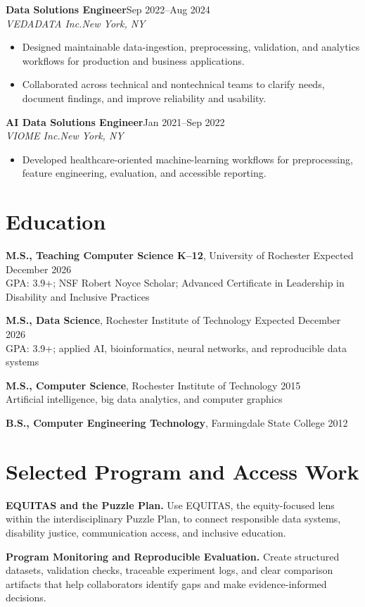 \documentclass[10pt,letterpaper]{article}
\newcommand{\role}[4]{%
  \textbf{#1}\hfill #2\\
  \textit{#3}\hfill \textit{#4}\vspace{-3pt}
}
\begin{document}
\role{Data Solutions Engineer}{Sep 2022--Aug 2024}
{VEDADATA Inc.}{New York, NY}
\begin{itemize}
  \item Designed maintainable data-ingestion, preprocessing, validation, and
    analytics workflows for production and business applications.
  \item Collaborated across technical and nontechnical teams to clarify needs,
    document findings, and improve reliability and usability.
\end{itemize}

\role{AI Data Solutions Engineer}{Jan 2021--Sep 2022}
{VIOME Inc.}{New York, NY}
\begin{itemize}
  \item Developed healthcare-oriented machine-learning workflows for
    preprocessing, feature engineering, evaluation, and accessible reporting.
\end{itemize}

\section*{Education}
\textbf{M.S., Teaching Computer Science K--12}, University of Rochester
\hfill Expected December 2026\\
GPA: 3.9+; NSF Robert Noyce Scholar; Advanced Certificate in Leadership in
Disability and Inclusive Practices

\textbf{M.S., Data Science}, Rochester Institute of Technology
\hfill Expected December 2026\\
GPA: 3.9+; applied AI, bioinformatics, neural networks, and reproducible data systems

\textbf{M.S., Computer Science}, Rochester Institute of Technology
\hfill 2015\\
Artificial intelligence, big data analytics, and computer graphics

\textbf{B.S., Computer Engineering Technology}, Farmingdale State College
\hfill 2012

\section*{Selected Program and Access Work}
\textbf{EQUITAS and the Puzzle Plan.}
Use EQUITAS, the equity-focused lens within the interdisciplinary Puzzle Plan,
to connect responsible data systems, disability justice, communication access,
and inclusive education.

\textbf{Program Monitoring and Reproducible Evaluation.}
Create structured datasets, validation checks, traceable experiment logs, and
clear comparison artifacts that help collaborators identify gaps and make
evidence-informed decisions.
\end{document}
